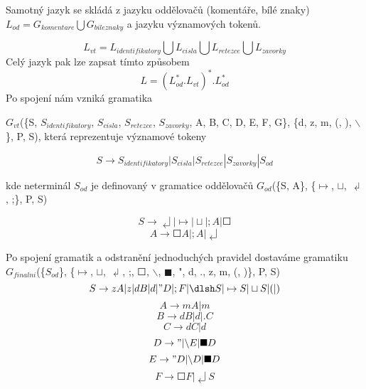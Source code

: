 \documentclass[a4paper,11pt]{article}
\begin{document}
Samotný jazyk se skládá z jazyku oddělovačů (komentáře, bílé znaky) $L_{od} = G_{komentare} \bigcup G_{bileznaky}$ a jazyku významových tokenů. 

$$L_{vt} = L_{identifikatory} \bigcup L_{cisla} \bigcup L_{retezce} \bigcup L_{zavorky}$$
Celý jazyk pak lze zapsat tímto způsobem 
$$L = (L^{*}_{od}.L_{vt})^{*}.L^{*}_{od}$$
Po spojení nám vzniká gramatika
 
$G_{vt}$(\{S, $S_{identifikatory}$, $S_{cisla}$, $S_{retezce}$, $S_{zavorky}$, A, B, C, D, E, F, G\}, \{d, z, m, (, ), $\backslash$ \}, P, S), která reprezentuje významové tokeny 

$$S \rightarrow S_{identifikatory} | S_{cisla} | S_{retezce} | S_{zavorky} | S_{od}$$

kde neterminál $S_{od}$ je definovaný v gramatice oddělovačů $G_{od}$(\{S, A\}, \{$\mapsto$, $\sqcup$, $\dlsh$, ;\}, P, S)

$$S \rightarrow \dlsh | \mapsto | \sqcup | ;A | \Square$$
$$A \rightarrow \Square A | ;A | \dlsh $$

Po spojení gramatik a odstranění jednoduchých pravidel dostaváme gramatiku
$G_{finalni}$(\{$S_{od}$\}, \{$\mapsto$, $\sqcup$, $\dlsh$, ;, $\Square$, $\backslash$, $\blacksquare$, ", d, ., z, m, (, )\}, P, S)
$$S \rightarrow zA | z | dB | d | "D | ;F | \dlsh S | \mapsto S | \sqcup S | ( | )$$
$$A \rightarrow mA | m$$
$$B \rightarrow dB | d | .C$$
$$C \rightarrow dC | d$$
$$D \rightarrow " | \backslash E | \blacksquare D$$
$$E \rightarrow "D | \backslash D | \blacksquare D$$
$$F \rightarrow \Square F | \dlsh S$$
\newpage
\end{document}
